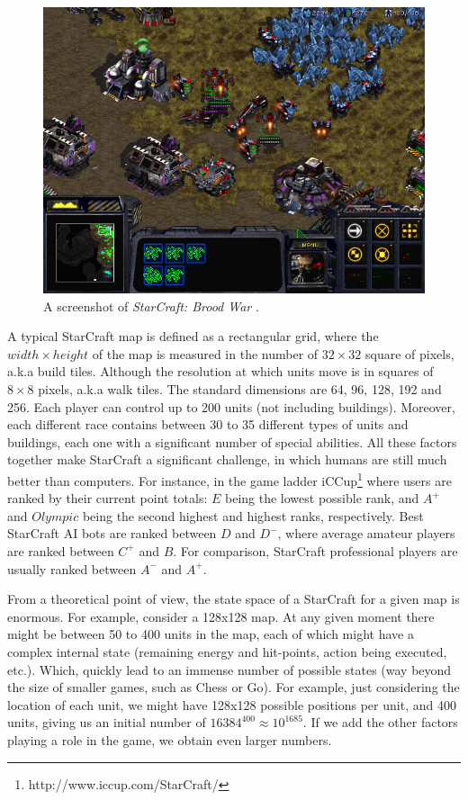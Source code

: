 \documentclass[journal]{IEEEtran}
\begin{document}
\begin{figure}
    \centering
    \includegraphics[width=0.8\columnwidth]{figures/starcraft1.png}
    \caption{A screenshot of \emph{StarCraft: Brood War}%
    .}
    \label{fig:StarCraft}
\end{figure}

A typical StarCraft map is defined as a rectangular grid, where the $width \times height$ of the map is measured in the number of $32 \times 32$ square of pixels, a.k.a build tiles. Although the
resolution  at which  units  move  is in squares of $8 \times 8$ pixels, a.k.a walk tiles. The standard dimensions are 64, 96, 128, 192 and 256. Each player  can
control up  to 200 units (not including  buildings).  Moreover, each
different race  contains between 30  to 35 different types  of units
and  buildings,  each  one  with  a significant  number  of  special
abilities. All these factors  together make StarCraft a significant
challenge,   in   which   humans    are   still   much   better   than
computers. For instance, in the game ladder iCCup\footnote{http://www.iccup.com/StarCraft/} where users are ranked by their current point totals: $E$ being the lowest possible rank, and $A^+$ and $Olympic$ being the second highest and highest ranks, respectively. Best StarCraft AI bots are ranked between $D$ and $D^−$, where average  amateur players are  ranked between $C^+$ and  $B$. For comparison, StarCraft professional  players are usually ranked between
$A^-$ and $A^+$.

From a theoretical point of view, the state space of a StarCraft for a given map is enormous. For example, consider a 128x128 map. At any given moment there might be between 50 to 400 units in the map, each of which might have a complex internal state (remaining energy and hit-points, action being executed, etc.). Which, quickly lead to an immense number of possible states (way beyond the size of smaller games, such as Chess or Go). For example, just considering the location of each unit, we might have 128x128 possible positions per unit, and 400 units, giving us an initial number of $16384^{400} \approx 10^{1685}$. If we add the other factors playing a role in the game, we obtain even larger numbers. 
\end{document}
